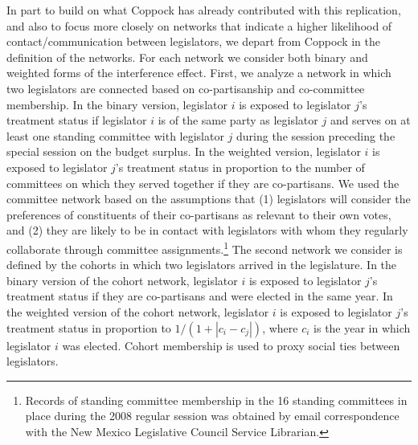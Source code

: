 \documentclass[12pt]{article}
\begin{document}
In part to build on what Coppock has already contributed with this replication, and also to focus more closely on networks that indicate a higher likelihood of contact/communication between legislators, we depart from Coppock in the definition of the networks. For each network we consider both binary and weighted forms of the interference effect. First, we analyze a network in which two legislators are connected based on co-partisanship and co-committee membership. In the binary version, legislator $i$ is exposed to legislator $j$'s treatment status if legislator $i$ is of the same party as legislator $j$ and serves on at least one standing committee with legislator $j$ during the session preceding the special session on the budget surplus. In the weighted version, legislator $i$ is exposed to legislator $j$'s treatment status in proportion to the number of committees on which they served together if they are co-partisans. We used the committee network based on the assumptions that (1) legislators will consider the preferences of constituents of their co-partisans as relevant to their own votes, and (2) they are likely to be in contact with legislators with whom they regularly collaborate through committee assignments.\footnote{Records of standing committee membership in the 16 standing committees in place during the 2008 regular session was obtained by email correspondence with the New Mexico Legislative Council Service Librarian.}  The second network we consider is defined by the cohorts in which two legislators arrived in the legislature. In the binary version of the cohort network, legislator $i$ is exposed to legislator $j$'s treatment status if they are co-partisans and were elected in the same year. In the weighted version of the cohort network, legislator $i$ is exposed to legislator $j$'s treatment status in proportion to $1/(1+|c_i-c_j|)$, where $c_i$ is the year in which legislator $i$ was elected. Cohort membership is used to proxy social ties between legislators.  
\end{document}
